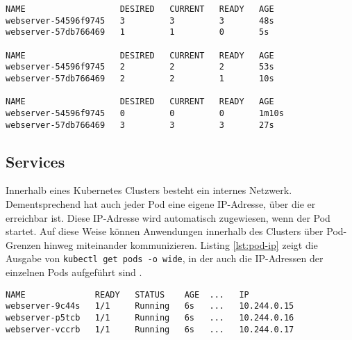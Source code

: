\documentclass[11pt,a4paper]{article}
\begin{document}
\begin{lstlisting}[caption={Ein Deployment, das schrittweise ein Update ausführt.}, label={lst:deploy-rollout}]
NAME                   DESIRED   CURRENT   READY   AGE
webserver-54596f9745   3         3         3       48s
webserver-57db766469   1         1         0       5s

NAME                   DESIRED   CURRENT   READY   AGE
webserver-54596f9745   2         2         2       53s
webserver-57db766469   2         2         1       10s

NAME                   DESIRED   CURRENT   READY   AGE
webserver-54596f9745   0         0         0       1m10s
webserver-57db766469   3         3         3       27s

\end{lstlisting}

\subsection{Services}
Innerhalb eines Kubernetes Clusters besteht ein internes Netzwerk. Dementsprechend hat auch jeder Pod
eine eigene IP-Adresse, über die er erreichbar ist. Diese IP-Adresse wird automatisch zugewiesen, wenn der Pod startet.
Auf diese Weise können Anwendungen innerhalb des Clusters über Pod-Grenzen hinweg miteinander kommunizieren.
Listing \ref{lst:pod-ip} zeigt die Ausgabe von \lstinline|kubectl get pods -o wide|, in der auch die IP-Adressen
der einzelnen Pods aufgeführt sind \cite{Schmeling_Dargatz_2022}.
\begin{lstlisting}[caption={\lstinline|kubectl get pods -o wide| veranschautlicht, dass jeder Pod seine eigene IP-Adresse erhält. Die Ausgabe wurde zur besseren Lesbarkeit gekürzt.}, label={lst:pod-ip}]
NAME              READY   STATUS    AGE  ...   IP           
webserver-9c44s   1/1     Running   6s   ...   10.244.0.15
webserver-p5tcb   1/1     Running   6s   ...   10.244.0.16
webserver-vccrb   1/1     Running   6s   ...   10.244.0.17
\end{lstlisting}
\end{document}
